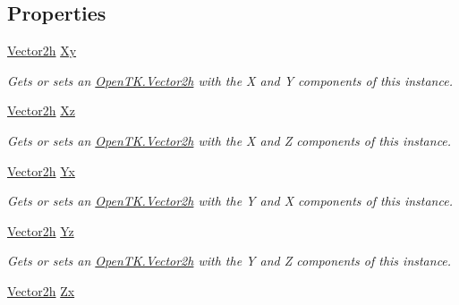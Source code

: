 \subsection*{Properties}
\begin{DoxyCompactItemize}
\item 
\hyperlink{struct_open_t_k_1_1_vector2h}{Vector2h} \hyperlink{struct_open_t_k_1_1_vector3h_add028391e6cdead82cc69f2e1af1e1e7}{Xy}
\begin{DoxyCompactList}\small\item\em Gets or sets an \hyperlink{struct_open_t_k_1_1_vector2h}{Open\-T\-K.\-Vector2h} with the X and Y components of this instance. \end{DoxyCompactList}\item 
\hyperlink{struct_open_t_k_1_1_vector2h}{Vector2h} \hyperlink{struct_open_t_k_1_1_vector3h_a538424451d707bbfd01795f619e4dd29}{Xz}
\begin{DoxyCompactList}\small\item\em Gets or sets an \hyperlink{struct_open_t_k_1_1_vector2h}{Open\-T\-K.\-Vector2h} with the X and Z components of this instance. \end{DoxyCompactList}\item 
\hyperlink{struct_open_t_k_1_1_vector2h}{Vector2h} \hyperlink{struct_open_t_k_1_1_vector3h_a0f7c7bda0a60e484981c1089fdce1204}{Yx}
\begin{DoxyCompactList}\small\item\em Gets or sets an \hyperlink{struct_open_t_k_1_1_vector2h}{Open\-T\-K.\-Vector2h} with the Y and X components of this instance. \end{DoxyCompactList}\item 
\hyperlink{struct_open_t_k_1_1_vector2h}{Vector2h} \hyperlink{struct_open_t_k_1_1_vector3h_a9172e82a50106f8eb80f62b901418151}{Yz}
\begin{DoxyCompactList}\small\item\em Gets or sets an \hyperlink{struct_open_t_k_1_1_vector2h}{Open\-T\-K.\-Vector2h} with the Y and Z components of this instance. \end{DoxyCompactList}\item 
\hyperlink{struct_open_t_k_1_1_vector2h}{Vector2h} \hyperlink{struct_open_t_k_1_1_vector3h_ab8db906757da2dc6f07320fce354188d}{Zx}

\end{DoxyCompactItemize}
